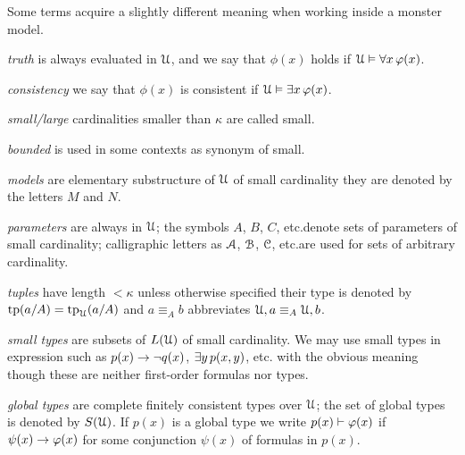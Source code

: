 Some terms acquire a slightly different meaning when working inside a monster model.

\newcommand{\labellalunga}[1]{#1\hfill}
\newenvironment{litemize}[1]
   {\begin{list}{}{
   \setlength{\parskip}{0mm}
   \setlength{\topsep}{5mm}
   \setlength{\partopsep}{0mm}
   \setlength{\rightmargin}{0mm}
   \setlength{\listparindent}{0mm}
   \setlength{\itemindent}{0mm}
   \setlength{\itemsep}{1mm}
   \settowidth{\labelwidth}{#1}
   \setlength{\parsep}{0mm}
   \setlength{\partopsep}{0mm}
   \setlength{\labelsep}{3mm}
   \setlength{\leftmargin}{\labelwidth+\labelsep}
   \let\makelabel\labellalunga}}{
   \end{list}}

\begin{litemize}{type-definable}
\item[\emph{truth}] is always evaluated in $\EuScript U$, and we say that $\phi(x)$ holds if $\EuScript U\vDash\forall x\,\varphi(x)$.
\item[\emph{consistency}] we say that $\phi(x)$ is consistent if $\EuScript U\vDash\exists x\,\varphi(x)$.
\item[\emph{small/large}] cardinalities smaller than $\kappa$ are called small.
\item[\emph{bounded}] is used in some contexts as synonym of small.
\item[\emph{models}] are elementary substructure of $\EuScript U$ of small cardinality they are denoted by the letters $M$ and $N$.
\item[\emph{parameters}] are always in $\EuScript U$; the symbols $A$, $B$, $C$, etc.\@ denote sets of parameters of small cardinality; calligraphic letters as $\EuScript A$, $\EuScript B$, $\EuScript C$, etc.\@ are used for sets of arbitrary cardinality.
\item[\emph{tuples}] have length $<\kappa$ unless otherwise specified their type is denoted by ${\rm tp}(a/A)={\rm tp}_\EuScript U(a/A)$ and $a\equiv_A b$ abbreviates $\EuScript U,a \equiv_A \EuScript U,b$.
\item[\emph{small types}] are subsets of $L(\EuScript U)$ of small cardinality.
We may use small types in expression such as $p(x)\rightarrow\neg q(x)$, $\exists y\,p(x,y)$, etc. with the obvious meaning though these are neither first-order formulas nor types.
\item[\emph{global types}] are complete finitely consistent types over $\EuScript U$; the set of global types is denoted by $S(\EuScript U)$. If $p(x)$ is a global type we write $p(x)\vdash\varphi(x)$ if $\psi(x)\rightarrow\varphi(x)$ for some conjunction $\psi(x)$ of formulas in $p(x)$.

\end{litemize}
